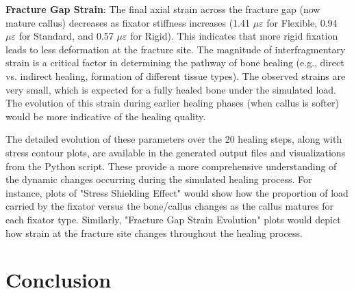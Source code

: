 \documentclass{article}
\begin{document}
\textbf{Fracture Gap Strain}:
The final axial strain across the fracture gap (now mature callus) decreases as fixator stiffness increases (1.41 $\mu\varepsilon$ for Flexible, 0.94 $\mu\varepsilon$ for Standard, and 0.57 $\mu\varepsilon$ for Rigid). This indicates that more rigid fixation leads to less deformation at the fracture site. The magnitude of interfragmentary strain is a critical factor in determining the pathway of bone healing (e.g., direct vs. indirect healing, formation of different tissue types). The observed strains are very small, which is expected for a fully healed bone under the simulated load. The evolution of this strain during earlier healing phases (when callus is softer) would be more indicative of the healing quality.

The detailed evolution of these parameters over the 20 healing steps, along with stress contour plots, are available in the generated output files and visualizations from the Python script. These provide a more comprehensive understanding of the dynamic changes occurring during the simulated healing process. For instance, plots of "Stress Shielding Effect" would show how the proportion of load carried by the fixator versus the bone/callus changes as the callus matures for each fixator type. Similarly, "Fracture Gap Strain Evolution" plots would depict how strain at the fracture site changes throughout the healing process.


\section{Conclusion}






\end{document}
